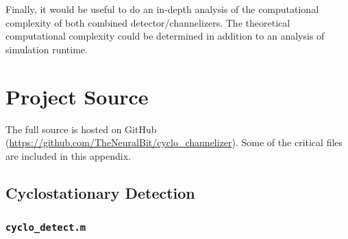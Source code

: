 \documentclass[12pt]{report}
\begin{document}
Finally, it would be useful to do an in-depth analysis of the computational
complexity of both combined detector/channelizers. The theoretical
computational complexity could be determined in addition to an analysis of
simulation runtime.


%
%

%



\nocite{*}


%

\appendix

\chapter{Project Source}
\label{sec:source}
The full source is hosted on GitHub
(\url{https://github.com/TheNeuralBit/cyclo\_channelizer}). Some of the
critical files are included in this appendix.

\section{Cyclostationary Detection}
\subsection{\texttt{cyclo\_detect.m}}

\end{document}
